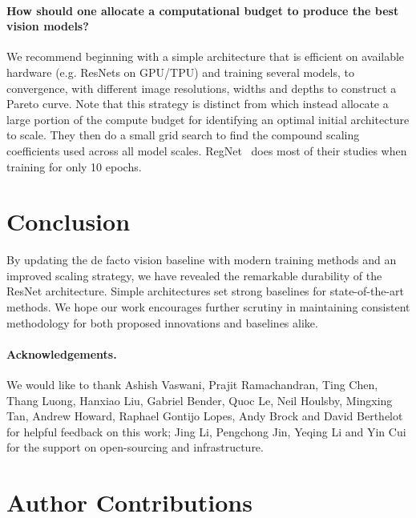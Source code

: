 \documentclass{article}
\begin{document}
\paragraph{How should one allocate a computational budget to produce the best vision models?}
We recommend beginning with a simple architecture that is efficient on available hardware (e.g. ResNets on GPU/TPU) and training several models, to convergence, with different image resolutions, widths and depths to construct a Pareto curve.
Note that this strategy is distinct from \citet{tan2019efficientnet} which instead allocate a large portion of the compute budget for identifying an optimal initial architecture to scale.
They then do a small grid search to find the compound scaling coefficients used across all model scales. 
RegNet~\cite{radosavovic2020designing} does most of their studies when training for only 10 epochs.


\section{Conclusion}
By updating the de facto vision baseline with modern training methods and an improved scaling strategy, we have revealed the remarkable durability of the ResNet architecture.
Simple architectures set strong baselines for state-of-the-art methods.
We hope our work encourages further scrutiny in maintaining consistent methodology for both proposed innovations and baselines alike. 
{\footnotesize \paragraph{Acknowledgements.} We would like to thank Ashish Vaswani, Prajit Ramachandran, Ting Chen, Thang Luong, Hanxiao Liu, Gabriel Bender, Quoc Le, Neil Houlsby, Mingxing Tan, Andrew Howard, Raphael Gontijo Lopes, Andy Brock and David Berthelot for helpful feedback on this work; Jing Li, Pengchong Jin, Yeqing Li and Yin Cui for the support on open-sourcing and infrastructure.}






\clearpage \onecolumn
\appendix
\section{Author Contributions}
\end{document}
